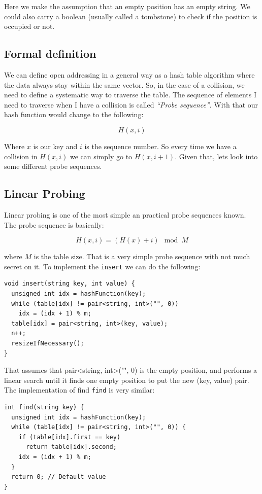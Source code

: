 Here we make the assumption that an empty position has an empty string. We could also carry a boolean (usually called a tombstone) to check if the position is occupied or not. 

\subsection{Formal definition}

We can define open addressing in a general way as a hash table algorithm where the data always stay within the same vector. So, in the case of a collision, we need to define a systematic way to traverse the table. The sequence of elements I need to traverse when I have a collision is called \textit{``Probe sequence''}. With that our hash function would change to the following:

\[ H(x, i) \]

Where \( x \) is our key and \( i \) is the sequence number. So every time we have a collision in \( H(x, i) \) we can simply go to \( H(x, i + 1) \). Given that, lets look into some different probe sequences.

\subsection{Linear Probing}

Linear probing is one of the most simple an practical probe sequences known. The probe sequence is basically:

\[ H(x, i) = (H(x) + i) \mod M \]

where \( M \) is the table size. That is a very simple probe sequence with not much secret on it. To implement the \texttt{insert} we can do the following:

\begin{lstlisting}
void insert(string key, int value) {
  unsigned int idx = hashFunction(key);
  while (table[idx] != pair<string, int>("", 0))
    idx = (idx + 1) % m;      
  table[idx] = pair<string, int>(key, value);
  n++;
  resizeIfNecessary();
}
\end{lstlisting}

That assumes that pair<string, int>("", 0) is the empty position, and performs a linear search until it finds one empty position to put the new (key, value) pair. The implementation of find \texttt{find} is very similar:

\newpage

\begin{lstlisting}
int find(string key) {
  unsigned int idx = hashFunction(key);
  while (table[idx] != pair<string, int>("", 0)) {
    if (table[idx].first == key) 
      return table[idx].second;
    idx = (idx + 1) % m;
  }
  return 0; // Default value
}
\end{lstlisting}

